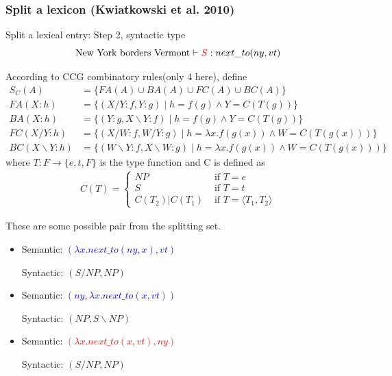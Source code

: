 \documentclass{beamer}
\begin{document}
\begin{frame}
    \frametitle{Split a lexicon (Kwiatkowski et al. 2010)}

    Split a lexical entry: Step 2, syntactic type
    \[
        \text{New York borders Vermont} \vdash \textcolor{red}{S}: next\_to(ny, vt)
    \]

     {
        According to CCG combinatory rules(only 4 here), define
        \begin{align*}
            S_C(A) &= \{FA(A) \cup BA(A) \cup FC(A) \cup BC(A) \}\\
            FA(X:h)&= \{ (X / Y : f, Y : g) \mid h = f(g) \wedge Y = C(T(g)) \}  \\
            BA(X:h)&= \{ (Y : g, X \backslash Y : f) \mid h = f(g) \wedge Y = C(T(g)) \}  \\
            FC(X / Y:h)&= \{ (X / W : f, W / Y : g) \mid
                h = \lambda x . f(g(x)) \wedge W = C(T(g(x))) \}  \\
            BC(X \backslash Y:h)&= \{ (W \backslash Y : f, X \backslash W : g) \mid
                h = \lambda x . f(g(x)) \wedge W = C(T(g(x))) \}
        \end{align*}
        where $T: F \to \{e, t, F\}$ is the type function and C is defined as
        \begin{gather*}
            C(T) = \begin{cases}
                NP & \text{ if } T=e \\ 
                S & \text{ if } T=t \\ 
                C(T_2)\vert C(T_1)  & \text{ if } T= \langle T_1, T_2\rangle
            \end{cases}
        \end{gather*}
    }

     {
        These are some possible pair from the splitting set.
        \begin{itemize}
            \item Semantic: \textcolor{blue}{$(\lambda x . next\_to(ny, x), vt)$}

                Syntactic: $(S/NP, NP)$

            \item Semantic: \textcolor{blue}{$(ny, \lambda x . next\_to(x, vt))$}

                Syntactic: $(NP, S\backslash NP)$

            \item Semantic: \textcolor{red}{$(\lambda x . next\_to(x, vt), ny)$}

                Syntactic: $(S/NP, NP)$

        \end{itemize}
    }

\end{frame}
\end{document}
